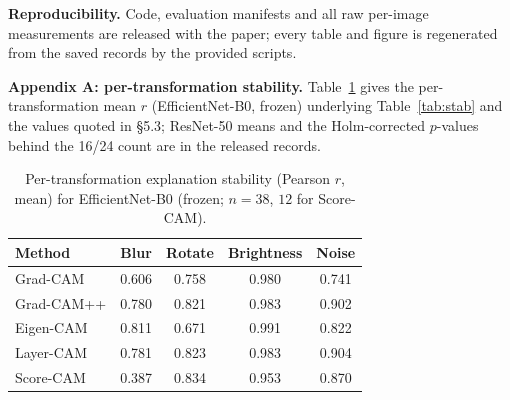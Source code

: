 \documentclass[runningheads]{llncs}
\begin{document}
\smallskip
\noindent\textbf{Reproducibility.} Code, evaluation manifests and all raw
per-image measurements are released with the paper; every table and figure is
regenerated from the saved records by the provided scripts.

\medskip
\noindent\textbf{Appendix A: per-transformation stability.} Table~\ref{tab:app}
gives the per-transformation mean $r$ (EfficientNet-B0, frozen) underlying
Table~\ref{tab:stab} and the values quoted in \S5.3; ResNet-50 means and the
Holm-corrected $p$-values behind the 16/24 count are in the released records.

\begin{table}[h]
\centering
\footnotesize
\setlength{\tabcolsep}{5pt}
\renewcommand{\arraystretch}{0.92}
\caption{Per-transformation explanation stability (Pearson $r$, mean) for
EfficientNet-B0 (frozen; $n{=}38$, $12$ for Score-CAM).}
\label{tab:app}
\begin{tabular}{lcccc}
\toprule
Method & Blur & Rotate & Brightness & Noise \\
\midrule
Grad-CAM   & 0.606 & 0.758 & 0.980 & 0.741 \\
Grad-CAM++ & 0.780 & 0.821 & 0.983 & 0.902 \\
Eigen-CAM  & 0.811 & 0.671 & 0.991 & 0.822 \\
Layer-CAM  & 0.781 & 0.823 & 0.983 & 0.904 \\
Score-CAM  & 0.387 & 0.834 & 0.953 & 0.870 \\
\bottomrule
\end{tabular}
\end{table}



\end{document}
